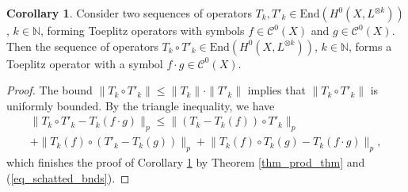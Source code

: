 \documentclass[12pt]{article}
\numberwithin{equation}{section}
\theoremstyle{theorem}
\theoremstyle{definition}
\newtheorem{cor}[thm]{Corollary}
\theoremstyle{remark}
\newcommand{\nat}{\mathbb{N}}
\newcommand{\enmr}[1]{\text{End}{(#1)}}
\newcommand{\ccal}{\mathscr{C}}
\begin{document}
	\begin{cor}\label{cor_prod_toepl}
		Consider two sequences of operators $T_k, T'_k \in {\enmr{H^0(X, L^{\otimes k})}}$, $k \in \nat$, forming Toeplitz operators with symbols $f \in \ccal^0(X)$ and $g \in \ccal^0(X)$.
		Then the sequence of operators $T_k \circ T'_k \in {\enmr{H^0(X, L^{\otimes k})}}$, $k \in \nat$, forms a Toeplitz operator with a symbol $f \cdot g \in \ccal^0(X)$.
	\end{cor}
	\begin{proof}
		The bound $\| T_k \circ T'_k \| \leq \| T_k \| \cdot \| T'_k \|$ implies that $\| T_k \circ T'_k \|$ is uniformly bounded.
		By the triangle inequality, we have
		\begin{multline}
			\big\| T_k \circ T'_k - T_k(f \cdot g) \big\|_p
			\leq
			\big\| (T_k - T_k(f)) \circ T'_k  \big\|_p
			\\
			+
			\big\| T_k(f) \circ (T'_k - T_k(g)) \big\|_p
			+
			\big\| T_k(f) \circ T_k(g) - T_k(f \cdot g) \big\|_p,
		\end{multline}
		which finishes the proof of Corollary \ref{cor_prod_toepl} by Theorem \ref{thm_prod_thm} and (\ref{eq_schatted_bnds}).
	\end{proof}		
	
\end{document}
